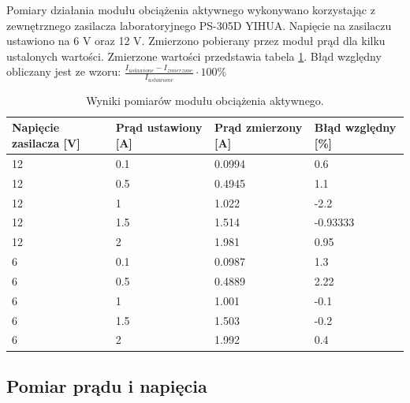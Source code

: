 Pomiary działania modułu obciążenia aktywnego wykonywano korzystając z zewnętrznego zasilacza laboratoryjnego PS-305D YIHUA.
Napięcie na zasilaczu ustawiono na 6 V oraz 12 V. Zmierzono pobierany przez moduł prąd dla kilku ustalonych wartości.
Zmierzone wartości przedstawia tabela \ref{tab:pomiaryObciazenia}. Błąd względny obliczany jest ze wzoru: 
$\frac{I_{ustawione} - I_{zmierzone}}{I_{ustawione}} \cdot 100 \%$
\begin{table}[]
\centering
\begin{tabular}{|l|l|l|l|}
\hline
Napięcie zasilacza {[}V{]} & Prąd ustawiony {[}A{]} & Prąd zmierzony {[}A{]} & Błąd względny {[}\%{]} \\ \hline
12                         & 0.1                    & 0.0994                 & 0.6                    \\ \hline
12                         & 0.5                    & 0.4945                 & 1.1                    \\ \hline
12                         & 1                      & 1.022                  & -2.2                   \\ \hline
12                         & 1.5                    & 1.514                  & -0.93333               \\ \hline
12                         & 2                      & 1.981                  & 0.95                   \\ \hline
6                          & 0.1                    & 0.0987                 & 1.3                    \\ \hline
6                          & 0.5                    & 0.4889                 & 2.22                   \\ \hline
6                          & 1                      & 1.001                  & -0.1                   \\ \hline
6                          & 1.5                    & 1.503                  & -0.2                   \\ \hline
6                          & 2                      & 1.992                  & 0.4                    \\ \hline
\end{tabular}
\caption{Wyniki pomiarów modułu obciążenia aktywnego.}
\label{tab:pomiaryObciazenia}
\end{table}



\subsection{Pomiar prądu i napięcia}

